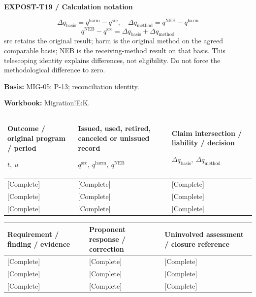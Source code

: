 \textbf{EXPOST-T19 / Calculation notation}\par
{\fontsize{9}{11}\selectfont\[ \Delta q_{\mathrm{basis}}=q^{\mathrm{harm}}-q^{\mathrm{src}},\quad \Delta q_{\mathrm{method}}=q^{\mathrm{NEB}}-q^{\mathrm{harm}} \]}
{\fontsize{9}{11}\selectfont\[ q^{\mathrm{NEB}}-q^{\mathrm{src}}=\Delta q_{\mathrm{basis}}+\Delta q_{\mathrm{method}} \]}
src retains the original result; harm is the original method on the agreed comparable basis; NEB is the receiving-method result on that basis. This telescoping identity explains differences, not eligibility. Do not force the methodological difference to zero.\par
\textbf{Basis:} MIG-05; P-13; reconciliation identity.\par
\textbf{Workbook:} Migration!E:K.\par\endgroup
{\sffamily\fontsize{8.3}{10.3}\selectfont\begin{longtable}{@{}P{54.83mm} P{54.83mm} P{54.83mm}@{}}
\toprule
\textbf{Outcome / original program / period}\par {\normalfont\fontsize{8.2}{10}\selectfont $t,\ u$} & \textbf{Issued, used, retired, canceled or unissued record}\par {\normalfont\fontsize{8.2}{10}\selectfont $q^{\mathrm{src}},\ q^{\mathrm{harm}},\ q^{\mathrm{NEB}}$} & \textbf{Claim intersection / liability / decision}\par {\normalfont\fontsize{8.2}{10}\selectfont $\Delta q_{\mathrm{basis}},\ \Delta q_{\mathrm{method}}$}\\\midrule\endhead
\rule{0pt}{8mm}[Complete] & [Complete] & [Complete]\\\hline
\rule{0pt}{8mm}[Complete] & [Complete] & [Complete]\\\hline
\rule{0pt}{8mm}[Complete] & [Complete] & [Complete]\\\hline
\end{longtable}}
{\sffamily\fontsize{8.3}{10.3}\selectfont\begin{longtable}{@{}P{54.83mm} P{54.83mm} P{54.83mm}@{}}
\toprule
\textbf{Requirement / finding / evidence} & \textbf{Proponent response / correction} & \textbf{Uninvolved assessment / closure reference}\\\midrule\endhead
\rule{0pt}{8mm}[Complete] & [Complete] & [Complete]\\\hline
\rule{0pt}{8mm}[Complete] & [Complete] & [Complete]\\\hline
\rule{0pt}{8mm}[Complete] & [Complete] & [Complete]\\\hline
\end{longtable}}
